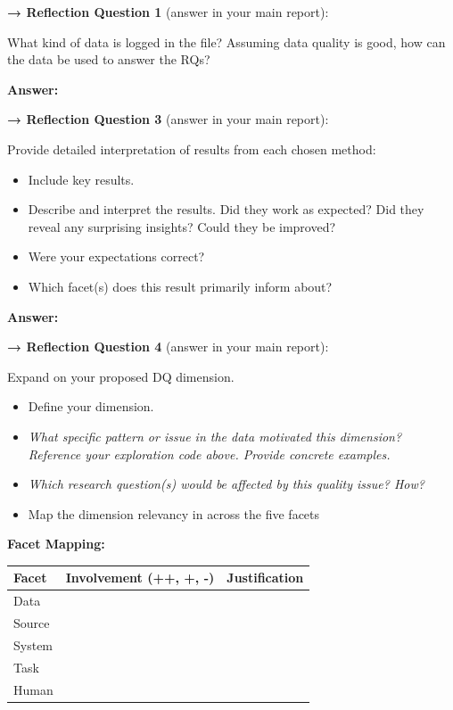 \textbf{→ Reflection Question 1} (answer in your main report):

What kind of data is logged in the file? Assuming data quality is good, how can the data be used to answer the RQs?

\textbf{Answer:}

\textbf{→ Reflection Question 3} (answer in your main report):

Provide detailed interpretation of results from each chosen method:
\begin{itemize}
  \item Include key results.
  \item Describe and interpret the results. Did they work as expected? Did they reveal any surprising insights? Could they be improved?
  \item Were your expectations correct?
  \item Which facet(s) does this result primarily inform about?
\end{itemize}

\textbf{Answer:}

\textbf{→ Reflection Question 4} (answer in your main report):

Expand on your proposed DQ dimension.
\begin{itemize}
  \item Define your dimension.
  \item \textit{What specific pattern or issue in the data motivated this dimension? Reference your exploration code above. Provide concrete examples.}
  \item \textit{Which research question(s) would be affected by this quality issue? How?}
  \item Map the dimension relevancy in across the five facets
\end{itemize}

\textbf{Facet Mapping:}

\begin{table}[H]
\centering
\small
\label{tab:d7_facet_mapping}
\begin{tabularx}{\textwidth}{l c X}
\toprule
Facet & Involvement (++, +, -) & Justification \\
\midrule
Data &  &  \\
Source &  &  \\
System &  &  \\
Task &  &  \\
Human &  &  \\
\bottomrule
\end{tabularx}
\end{table}

